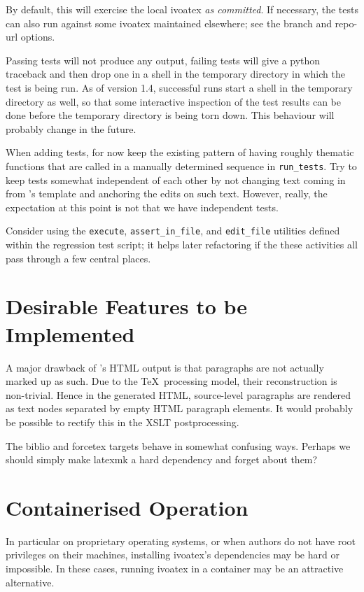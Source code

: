 \documentclass[11pt,a4paper]{ivoa}
\begin{document}
By default, this will exercise the local ivoatex \emph{as committed}.
If necessary, the tests can also run against some ivoatex maintained
elsewhere; see the branch and repo-url options.

Passing tests will not produce any output, failing tests will give a
python traceback and then drop one in a shell in the temporary directory
in which the test is being run.  As of version 1.4, successful runs
start a shell in the temporary directory as well, so that some
interactive inspection of the test results can be done before the
temporary directory is being torn down.  This behaviour will probably
change in the future.

When adding tests, for now keep the existing pattern of having roughly
thematic functions that are called in a manually determined sequence in
\verb|run_tests|.  Try to keep tests somewhat independent of each other by
not changing text coming in from \ivoatex's template and anchoring the
edits on such text.  However, really, the expectation at this point is
not that we have independent tests.

Consider using the \verb|execute|, \verb|assert_in_file|, and
\verb|edit_file| utilities defined within the regression test script; it
helps later refactoring if the these activities all pass through a few
central places.

\section{Desirable Features to be Implemented}

A major drawback of \ivoatex's HTML output is that paragraphs are not actually
marked up as such.  Due to the \TeX\ processing model, their
reconstruction is non-trivial.  Hence in the generated HTML,
source-level paragraphs are rendered as text nodes separated by empty
HTML paragraph elements.  It would probably be possible to rectify this
in the XSLT postprocessing.

The biblio and forcetex targets behave in somewhat confusing ways.
Perhaps we should simply make latexmk a hard dependency and forget about
them?

\appendix
\section{Containerised Operation}

In particular on proprietary operating systems, or when authors do not
have root privileges on their machines, installing ivoatex's
dependencies may be hard or impossible.  In these cases, running ivoatex
in a container may be an attractive alternative.
\end{document}
